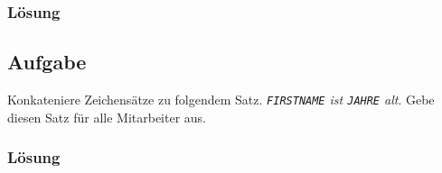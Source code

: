 \subsubsection*{Lösung}
\label{sec:uebung_03.aufgabe_12.loesung}

\subsection{Aufgabe}
\label{sec:uebung_03.aufgabe_13}
Konkateniere Zeichensätze zu folgendem Satz. \textit{\texttt{FIRSTNAME} ist \texttt{JAHRE} alt}. Gebe diesen Satz für alle Mitarbeiter aus.

\subsubsection*{Lösung}
\label{sec:uebung_03.aufgabe_13.loesung}

